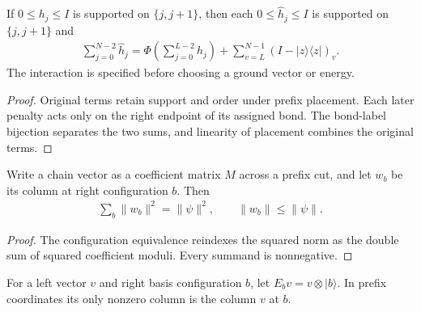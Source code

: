 \begin{lemma}
    \label{thm:lvv_padded_interaction_sum}
    \leanok
    If $0\le h_j\le I$ is supported on $\{j,j+1\}$, then each
    $0\le\widehat h_j\le I$ is supported on $\{j,j+1\}$ and
    \begin{align*}
        \sum_{j=0}^{N-2}\widehat h_j
        =\Phi\left(\sum_{j=0}^{L-2}h_j\right)
        +\sum_{v=L}^{N-1}(I-|z\rangle\langle z|)_v.
    \end{align*}
    The interaction is specified before choosing a ground vector or energy.
\end{lemma}
\begin{proof}
    \leanok
    Original terms retain support and order under prefix placement.
    Each later penalty acts only on the right endpoint of its assigned bond.
    The bond-label bijection separates the two sums, and linearity of
    placement combines the original terms.
\end{proof}

\begin{lemma}
    \label{thm:lvv_prefix_column_norm}
    \leanok
    Write a chain vector as a coefficient matrix $M$ across a prefix cut,
    and let $w_b$ be its column at right configuration $b$. Then
    \begin{align*}
        \sum_b\|w_b\|^2=\|\psi\|^2,\qquad \|w_b\|\le\|\psi\|.
    \end{align*}
\end{lemma}
\begin{proof}
    \leanok
    The configuration equivalence reindexes the squared norm as the double
    sum of squared coefficient moduli. Every summand is nonnegative.
\end{proof}

\begin{definition}
    \label{def:lvv_right_basis_extension}
    \leanok
    For a left vector $v$ and right basis configuration $b$, let
    $E_bv=v\otimes|b\rangle$. In prefix coordinates its only nonzero
    column is the column $v$ at $b$.
\end{definition}

